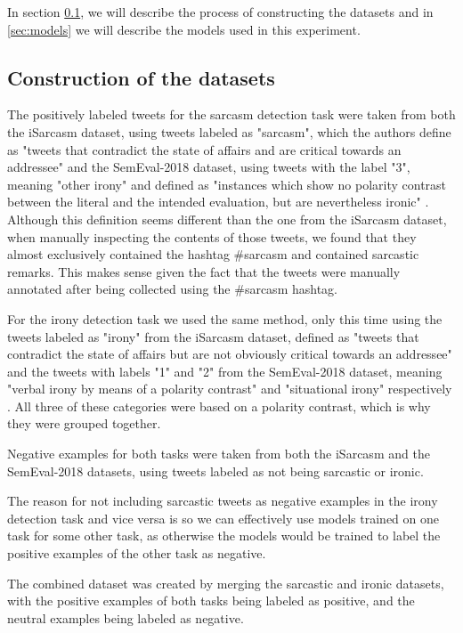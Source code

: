 \documentclass[10pt, a4paper]{article}
\begin{document}
In section \ref{sec:dataset_construction}, we will describe the process of constructing the datasets and in \ref{sec:models}
we will describe the models used in this experiment.

\subsection{Construction of the datasets}\label{sec:dataset_construction}

The positively labeled tweets for the sarcasm detection task were taken from both the iSarcasm dataset, using tweets labeled
as "sarcasm", which the authors define as "tweets that contradict the state of affairs and are critical towards an addressee"
\citep{iSarcasm} and the SemEval-2018 dataset, using tweets with the label "3", meaning "other irony" and defined as "instances
which show no polarity contrast between the literal and the intended evaluation, but are nevertheless ironic" 
\citep{semeval-2018}. Although this definition seems different than the one from the iSarcasm dataset, when manually
inspecting the contents of those tweets, we found that they almost exclusively contained the hashtag \#sarcasm and contained
sarcastic remarks. This makes sense given the fact that the tweets were manually annotated after being collected using the
\#sarcasm hashtag.

For the irony detection task we used the same method, only this time using the tweets labeled as "irony" from the iSarcasm
dataset, defined as "tweets that contradict the state of affairs but are not obviously critical towards an
addressee" \citep{iSarcasm} and the tweets with labels "1" and "2" from the SemEval-2018 dataset, meaning "verbal irony by means 
of a polarity contrast" and "situational irony" respectively \citep{semeval-2018}. All three of these categories were based
on a polarity contrast, which is why they were grouped together.

Negative examples for both tasks were taken from both the iSarcasm and the SemEval-2018 datasets, using tweets labeled as
not being sarcastic or ironic.

The reason for not including sarcastic tweets as negative examples in the irony detection task and vice versa is so we
can effectively use models trained on one task for some other task, as otherwise the models would be trained
to label the positive examples of the other task as negative.

The combined dataset was created by merging the sarcastic and ironic datasets, with the positive examples of both tasks
being labeled as positive, and the neutral examples being labeled as negative.
\end{document}
